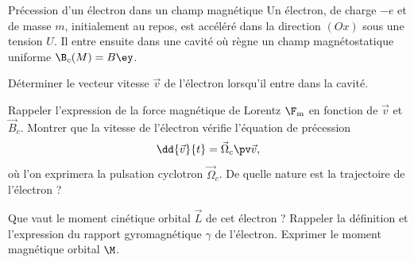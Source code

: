 \begin{exo}[PC][2][TD]{Précession d'un électron dans un champ magnétique}
	Un électron, de charge $-e$ et de masse $m$, initialement au repos, est accéléré dans la direction $(Ox)$ sous une tension $U$. Il entre ensuite dans une cavité où règne un champ magnétostatique uniforme $\B_c(M) = B \ey$.


\begin{quest}
	\item
	Déterminer le vecteur vitesse $\Vec{v}$ de l'électron lorsqu'il entre dans la cavité.
	\item\label{quest:L} Rappeler l'expression de la force magnétique de Lorentz $\F_{\rm m}$ en fonction de $\Vec{v}$ et $\Vec{B}_c$. Montrer que la vitesse de l'électron vérifie l'équation de précession 
	\begin{equation}
		\dd{\Vec{v}}{t} = \Vec{\Omega}_c \pv \Vec{v},
	\end{equation}
	où l'on exprimera la pulsation cyclotron $\Vec{\Omega}_c$. De quelle nature est la trajectoire de l'électron ?

	\item Que vaut le moment cinétique orbital $\Vec{L}$ de cet électron ? Rappeler la définition et l'expression du rapport gyromagnétique $\gamma$ de l'électron. Exprimer le moment magnétique orbital $\M$.


\end{quest}
\end{exo}

